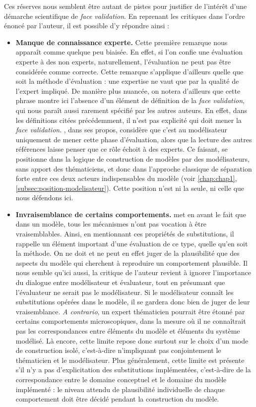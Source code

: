 Ces réserves nous semblent être autant de pistes pour justifier de l'intérêt d'une démarche scientifique de \textit{face validation}. En reprenant les critiques dans l'ordre énoncé par l'auteur, il est possible d'y répondre ainsi :
\begin{itemize}
	\item \textbf{Manque de connaissance experte.}
	Cette première remarque nous apparaît comme quelque peu biaisée.
	En effet, si l'on confie une évaluation experte à des non experts, naturellement, l'évaluation ne peut pas être considérée comme correcte.
	Cette remarque s'applique d'ailleurs quelle que soit la méthode d'évaluation : une expertise ne vaut que par la qualité de l'expert impliqué.
	De manière plus nuancée, on notera d'ailleurs que cette phrase montre ici l'absence d'un élément de définition de la \textit{face validation}, qui nous paraît aussi rarement spécifié par les autres auteurs.
	En effet, dans les définitions citées précédemment, il n'est pas explicité qui doit mener la \textit{face validation}.
	\citeauthor{hermann_validation_1967}, dans ses propos, considère que c'est au modélisateur uniquement de mener cette phase d'évaluation, alors que la lecture des autres références laisse penser que ce rôle échoit à des experts.
	Ce faisant, \citeauthor{hermann_validation_1967} se positionne dans la logique de construction de modèles par des modélisateurs, sans apport des thématiciens, et donc dans l'approche classique de séparation forte entre ces deux acteurs indispensables du modèle (voir \cref{chap:chap1}, \cref{subsec:position-modelisateur}).
	Cette position n'est ni la seule, ni celle que nous défendons ici.
	
	\item \textbf{Invraisemblance de certains comportements.}
	\citeauthor{hermann_validation_1967} met en avant le fait que dans un modèle, tous les mécanismes n'ont pas vocation à être vraisemblables.
	Ainsi, en mentionnant ces \og propriétés de substitutions\fg{}, il rappelle un élément important d'une évaluation de ce type, quelle qu'en soit la méthode.
	On ne doit et ne peut en effet juger de la plausibilité que des aspects du modèle qui cherchent à reproduire un comportement plausible.
	Il nous semble qu'ici aussi, la critique de l'auteur revient à ignorer l'importance du dialogue entre modélisateur et évaluateur, tout en présumant que l'évaluateur ne serait pas le modélisateur.
	Si le modélisateur connaît les \og substitutions\fg{} opérées dans le modèle, il se gardera donc bien de juger de leur vraisemblance.
	\textit{A contrario}, un expert thématicien pourrait être étonné par certains comportements microscopiques, dans la mesure où il ne connaîtrait pas les correspondances entre éléments du modèle et éléments du système modélisé.
	Là encore, cette limite repose donc surtout sur le choix d'un mode de construction isolé, c'est-à-dire n'impliquant pas conjointement le thématicien et le modélisateur.
	Plus généralement, cette limite est présente s'il n'y a pas d'explicitation des \og substitutions\fg{} implémentées, c'est-à-dire de la correspondance entre le domaine conceptuel et le domaine du modèle implémenté : le niveau attendu de plausibilité individuelle de chaque comportement doit être décidé pendant la construction du modèle.
	

\end{itemize}
